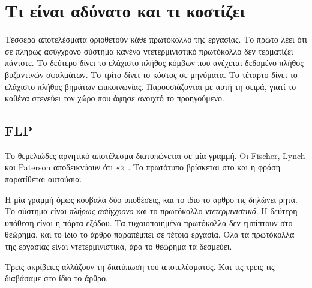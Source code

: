 \section{Τι είναι αδύνατο και τι κοστίζει}
\label{sec:bounds}

Τέσσερα αποτελέσματα οριοθετούν κάθε πρωτόκολλο της εργασίας. Το πρώτο
λέει ότι σε πλήρως ασύγχρονο σύστημα κανένα ντετερμινιστικό πρωτόκολλο
δεν τερματίζει πάντοτε. Το δεύτερο δίνει το ελάχιστο πλήθος κόμβων που
ανέχεται δεδομένο πλήθος βυζαντινών σφαλμάτων. Το τρίτο δίνει το κόστος
σε μηνύματα. Το τέταρτο δίνει το ελάχιστο πλήθος βημάτων επικοινωνίας.
Παρουσιάζονται με αυτή τη σειρά, γιατί το καθένα στενεύει τον χώρο που
άφησε ανοιχτό το προηγούμενο.

\subsection{FLP}

Το θεμελιώδες αρνητικό αποτέλεσμα διατυπώνεται σε μία γραμμή. Οι
Fischer, Lynch και Paterson αποδεικνύουν ότι «» \cite{fischer1985impossibility}.
Το πρωτότυπο βρίσκεται στο  και η φράση παρατίθεται αυτούσια.

Η μία γραμμή όμως κουβαλά δύο υποθέσεις, και το ίδιο το άρθρο τις
δηλώνει ρητά. Το σύστημα είναι \emph{πλήρως ασύγχρονο} και το πρωτόκολλο
\emph{ντετερμινιστικό}. Η δεύτερη υπόθεση είναι η πόρτα εξόδου. Τα
τυχαιοποιημένα πρωτόκολλα δεν εμπίπτουν στο θεώρημα, και το ίδιο το
άρθρο παραπέμπει σε τέτοια εργασία. Όλα τα πρωτόκολλα της εργασίας είναι
ντετερμινιστικά, άρα το θεώρημα τα δεσμεύει.

Τρεις ακρίβειες αλλάζουν τη διατύπωση του αποτελέσματος. Και τις τρεις
τις διαβάσαμε στο ίδιο το άρθρο.


